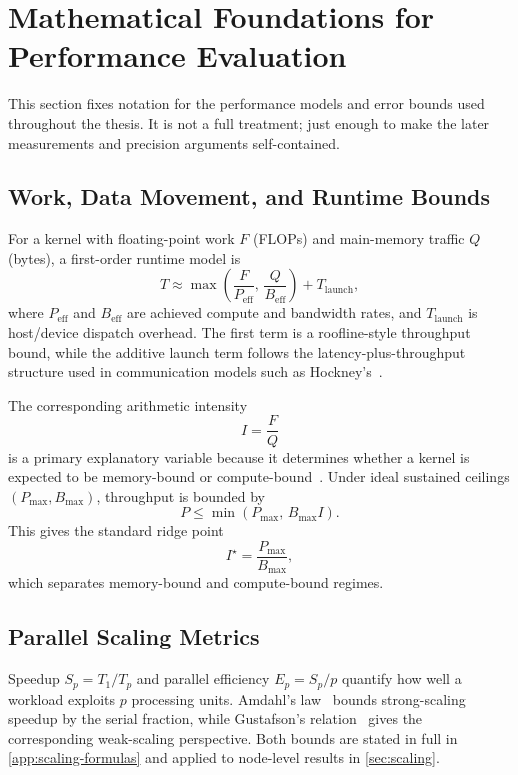 \section{Mathematical Foundations for Performance Evaluation}
\label{sec:math-foundations}

This section fixes notation for the performance models and error bounds
used throughout the thesis. It is not a full treatment; just enough to
make the later measurements and precision arguments self-contained.

\subsection{Work, Data Movement, and Runtime Bounds}

For a kernel with floating-point work $F$ (FLOPs) and main-memory traffic
$Q$ (bytes), a first-order runtime model is
\[
  T \approx \max\!\left(\frac{F}{P_{\mathrm{eff}}},\,\frac{Q}{B_{\mathrm{eff}}}\right) + T_{\mathrm{launch}},
\]
where $P_{\mathrm{eff}}$ and $B_{\mathrm{eff}}$ are achieved compute and
bandwidth rates, and $T_{\mathrm{launch}}$ is host/device dispatch overhead.
The first term is a roofline-style throughput bound, while the additive launch
term follows the latency-plus-throughput structure used in communication models
such as Hockney's~\cite{williams2009roofline,hockney1988parallel}.

The corresponding arithmetic intensity
\[
  I=\frac{F}{Q}
\]
is a primary explanatory variable because it determines whether a kernel is
expected to be memory-bound or compute-bound~\cite{williams2009roofline}. Under
ideal sustained ceilings
$(P_{\max},B_{\max})$, throughput is bounded by
\[
  P \le \min\!\left(P_{\max},\,B_{\max}I\right).
\]
This gives the standard ridge point
\[
  I^\star=\frac{P_{\max}}{B_{\max}},
\]
which separates memory-bound and compute-bound regimes.

\subsection{Parallel Scaling Metrics}

Speedup $S_p = T_1/T_p$ and parallel efficiency $E_p = S_p/p$ quantify how
well a workload exploits $p$ processing units. Amdahl's
law~\cite{amdahl1967validity} bounds strong-scaling speedup by the serial
fraction, while Gustafson's relation~\cite{gustafson1988reevaluating} gives
the corresponding weak-scaling perspective. Both bounds are stated in full in
\cref{app:scaling-formulas} and applied to node-level results in
\cref{sec:scaling}.

